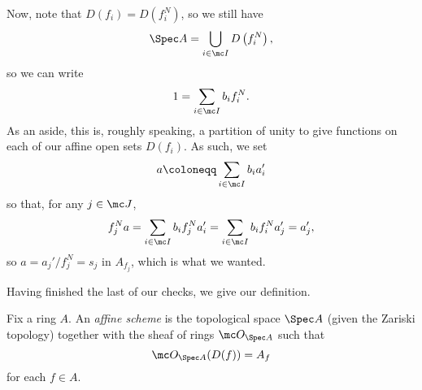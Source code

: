 \documentclass[../notes.tex]{subfiles}
\begin{document}
Now, note that $D(f_i)=D\left(f_i^N\right)$, so we still have
\[\Spec A=\bigcup_{i\in\mc I}D\left(f_i^N\right),\]
so we can write
\[1=\sum_{i\in\mc I}b_if_i^N.\]
As an aside, this is, roughly speaking, a partition of unity to give functions on each of our affine open sets $D(f_i)$. As such, we set
\[a\coloneqq\sum_{i\in\mc I}b_ia_i'\]
so that, for any $j\in\mc J$,
\[f_j^Na=\sum_{i\in\mc I}b_if_j^Na_i'=\sum_{i\in\mc I}b_if_i^Na_j'=a_j',\]
so $a=a_j'/f_j^N=s_j$ in $A_{f_j}$, which is what we wanted.

Having finished the last of our checks, we give our definition.
\begin{definition}
	Fix a ring $A$. An \textit{affine scheme} is the topological space $\Spec A$ (given the Zariski topology) together with the sheaf of rings $\mc O_{\Spec A}$ such that
	\[\mc O_{\Spec A}(D(f))=A_f\]
	for each $f\in A$.
\end{definition}
\end{document}
